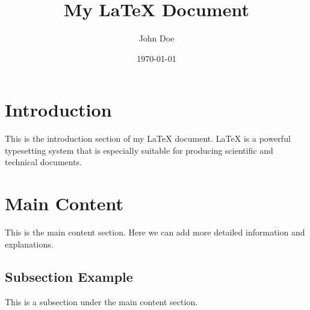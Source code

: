 \documentclass{article}
\title{My LaTeX Document}
\author{John Doe}
\date{\today}
\begin{document}
\maketitle

\section{Introduction}
This is the introduction section of my LaTeX document. LaTeX is a powerful typesetting system that is especially suitable for producing scientific and technical documents.

\section{Main Content}
This is the main content section. Here we can add more detailed information and explanations.

\subsection{Subsection Example}
This is a subsection under the main content section.
\end{document}
